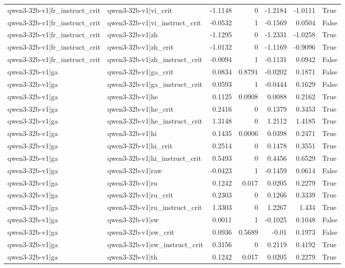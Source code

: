\begin{table}
\begin{tabular}{l l r r r r l}
qwen3-32b-v1|fr_instruct_crit & qwen3-32b-v1|vi_crit & -1.1148 & 0 & -1.2184 & -1.0111 & True \\
qwen3-32b-v1|fr_instruct_crit & qwen3-32b-v1|vi_instruct_crit & -0.0532 & 1 & -0.1569 & 0.0504 & False \\
qwen3-32b-v1|fr_instruct_crit & qwen3-32b-v1|zh & -1.1295 & 0 & -1.2331 & -1.0258 & True \\
qwen3-32b-v1|fr_instruct_crit & qwen3-32b-v1|zh_crit & -1.0132 & 0 & -1.1169 & -0.9096 & True \\
qwen3-32b-v1|fr_instruct_crit & qwen3-32b-v1|zh_instruct_crit & -0.0094 & 1 & -0.1131 & 0.0942 & False \\
qwen3-32b-v1|ga & qwen3-32b-v1|ga_crit & 0.0834 & 0.8791 & -0.0202 & 0.1871 & False \\
qwen3-32b-v1|ga & qwen3-32b-v1|ga_instruct_crit & 0.0593 & 1 & -0.0444 & 0.1629 & False \\
qwen3-32b-v1|ga & qwen3-32b-v1|he & 0.1125 & 0.0908 & 0.0088 & 0.2162 & True \\
qwen3-32b-v1|ga & qwen3-32b-v1|he_crit & 0.2416 & 0 & 0.1379 & 0.3453 & True \\
qwen3-32b-v1|ga & qwen3-32b-v1|he_instruct_crit & 1.3148 & 0 & 1.2112 & 1.4185 & True \\
qwen3-32b-v1|ga & qwen3-32b-v1|hi & 0.1435 & 0.0006 & 0.0398 & 0.2471 & True \\
qwen3-32b-v1|ga & qwen3-32b-v1|hi_crit & 0.2514 & 0 & 0.1478 & 0.3551 & True \\
qwen3-32b-v1|ga & qwen3-32b-v1|hi_instruct_crit & 0.5493 & 0 & 0.4456 & 0.6529 & True \\
qwen3-32b-v1|ga & qwen3-32b-v1|raw & -0.0423 & 1 & -0.1459 & 0.0614 & False \\
qwen3-32b-v1|ga & qwen3-32b-v1|ru & 0.1242 & 0.017 & 0.0205 & 0.2279 & True \\
qwen3-32b-v1|ga & qwen3-32b-v1|ru_crit & 0.2303 & 0 & 0.1266 & 0.3339 & True \\
qwen3-32b-v1|ga & qwen3-32b-v1|ru_instruct_crit & 1.3303 & 0 & 1.2267 & 1.434 & True \\
qwen3-32b-v1|ga & qwen3-32b-v1|sw & 0.0011 & 1 & -0.1025 & 0.1048 & False \\
qwen3-32b-v1|ga & qwen3-32b-v1|sw_crit & 0.0936 & 0.5689 & -0.01 & 0.1973 & False \\
qwen3-32b-v1|ga & qwen3-32b-v1|sw_instruct_crit & 0.3156 & 0 & 0.2119 & 0.4192 & True \\
qwen3-32b-v1|ga & qwen3-32b-v1|th & 0.1242 & 0.017 & 0.0205 & 0.2279 & True \\

\end{tabular}
\end{table}
